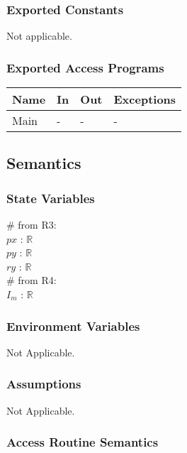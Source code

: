 \documentclass[12pt, titlepage]{article}
\begin{document}
\subsubsection{Exported Constants}
Not applicable.

\subsubsection{Exported Access Programs}

\begin{center}
\begin{tabular}{p{2cm} p{4cm} p{4cm} p{2cm}}
\hline
\textbf{Name} & \textbf{In} & \textbf{Out} & \textbf{Exceptions} \\
\hline
Main & - & - & - \\
\hline
\end{tabular}
\end{center}

\subsection{Semantics}

\subsubsection{State Variables}

$\#$ from R3:\\
$px$ : $\mathbb{R}$ \\
$py$ : $\mathbb{R}$ \\
$ry$ : $\mathbb{R}$ \\
\newline
$\#$ from R4:\\
$I_m$ : $\mathbb{R}$ \\

\subsubsection{Environment Variables}

Not Applicable.

\subsubsection{Assumptions}

Not Applicable.

\subsubsection{Access Routine Semantics}
\end{document}
